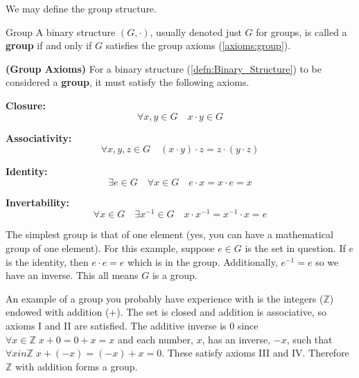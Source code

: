 We may define the group structure.
\begin{defn}{Group}
  A binary structure $(G, \cdot)$, usually denoted just $G$ for groups, is called a \textbf{group} if and only if $G$ satisfies the group axioms (\ref{axioms:group}).
\end{defn}

\begin{axiomset}
\label{axioms:group}
  \textbf{(Group Axioms)}
  For a binary structure (\ref{defn:Binary_Structure}) to be considered a \textbf{group}, it must satisfy the following axioms.
  \begin{axiom}
     \textbf{Closure:}
     \begin{equation}
       \forall x,y \in G \quad x\cdot y \in G
     \end{equation}
  \end{axiom}
  \begin{axiom}
     \textbf{Associativity:}
     \begin{equation}
       \forall x,y,z \in G \quad (x\cdot y) \cdot z = z \cdot (y \cdot z)
     \end{equation}
  \end{axiom}
  \begin{axiom}
     \textbf{Identity:}
     \begin{equation}
       \exists e \in G \quad \forall x \in G \quad e\cdot x = x \cdot e = x
     \end{equation}
  \end{axiom}
  \begin{axiom}
     \textbf{Invertability:}
     \begin{equation}
       \forall x \in G \quad \exists x^{-1} \in G \quad x \cdot x^{-1} = x^{-1} \cdot x = e
     \end{equation}
  \end{axiom}
\end{axiomset}

\begin{ex}
  The simplest group is that of one element (yes, you can have a mathematical group of one element).
  For this example, suppose $e \in G$ is the set in question.
  If $e$ is the identity, then $e \cdot e = e$ which is in the group.
  Additionally, $e^{-1} = e$ so we have an inverse.
  This all means $G$ is a group.
\end{ex}

\begin{ex}
  An example of a group you probably have experience with is the integers ($\mathbb{Z}$) endowed with addition ($+$).
  The set is closed and addition is associative, so axioms I and II are satisfied.
  The additive inverse is $0$ since $\forall x \in \mathbb{Z} \; x + 0 = 0 + x = x $ and each number, $x$, has an inverse, $-x$, such that $\forall x in \mathbb{Z} \; x + (-x) = (-x) + x = 0$.
  These satisfy axioms III and IV\@.
  Therefore $\mathbb{Z}$ with addition forms a group.
\end{ex}


